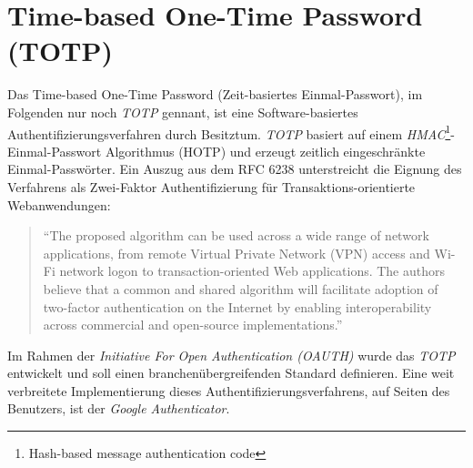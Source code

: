 \documentclass[11pt,a4paper,ngerman]{scrreprt}
\begin{document}
\section{Time-based One-Time Password (TOTP)}\label{sec:TOTP}
Das Time-based One-Time Password (Zeit-basiertes Einmal-Passwort), im Folgenden nur noch \textit{TOTP} gennant, ist eine Software-basiertes Authentifizierungsverfahren durch Besitztum. \textit{TOTP} basiert auf einem \textit{HMAC}\footnote{Hash-based message authentication code}-Einmal-Passwort Algorithmus (HOTP) und erzeugt zeitlich eingeschränkte Einmal-Passwörter. Ein Auszug aus dem RFC 6238 unterstreicht die Eignung des Verfahrens als Zwei-Faktor Authentifizierung für Transaktions-orientierte Webanwendungen:
\begin{quote}
    ``The proposed algorithm can be used across a wide range of network
    applications, from remote Virtual Private Network (VPN) access and
    Wi-Fi network logon to transaction-oriented Web applications.  The
    authors believe that a common and shared algorithm will facilitate
    adoption of two-factor authentication on the Internet by enabling
    interoperability across commercial and open-source implementations.'' \cite{rfc6238}
\end{quote}
Im Rahmen der \textit{Initiative For Open Authentication (OAUTH)} wurde das \textit{TOTP} entwickelt und soll einen branchenübergreifenden Standard definieren. Eine weit verbreitete Implementierung dieses Authentifizierungsverfahrens, auf Seiten des Benutzers, ist der \textit{Google Authenticator}.
\end{document}
